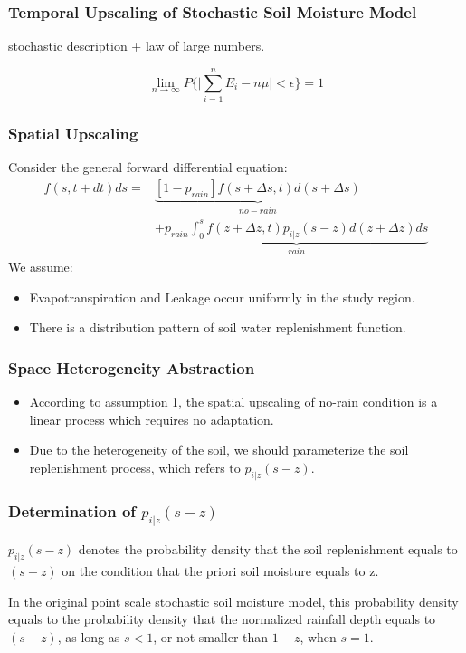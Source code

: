 \documentclass{beamer}
\begin{document}
\begin{frame}
\frametitle{Temporal Upscaling of Stochastic Soil Moisture Model}
\begin{center}
stochastic description + law of large numbers.
\end{center} 
\begin{equation}
\lim_{n\to\infty}P\lbrace\vert\sum_{i=1}^n E_i-n\mu\vert<\epsilon\rbrace=1
\end{equation}
\end{frame}
\begin{frame}
\frametitle{Spatial Upscaling}
Consider the general forward differential equation:
\begin{equation*}
\begin{split}
f(s,t+dt)ds=&\underbrace{[1-p_{rain}]f(s+\Delta s,t)d(s+\Delta s)}_{no-rain}\\&+\underbrace{p_{rain} \int_{0}^{s} f(z+\Delta z,t)p_{i|z}(s-z)d(z+\Delta z)ds}_{rain}
\end{split}
\end{equation*}
We assume:
\begin{itemize}
\item Evapotranspiration and Leakage occur uniformly in the study region.
\item There is a distribution pattern of soil water replenishment function.  
\end{itemize}
\end{frame}
\begin{frame}
\frametitle{Space Heterogeneity Abstraction}
\begin{itemize}
\item According to assumption 1, the spatial upscaling of no-rain condition is a linear process which requires no adaptation.
\item Due to the heterogeneity of the soil, we should parameterize the soil replenishment process, which refers to $p_{i|z}(s-z)$.
\end{itemize}
\end{frame}
\begin{frame}
\frametitle{Determination of $p_{i|z}(s-z)$}
$p_{i|z}(s-z)$ denotes the probability density that the soil replenishment equals to $(s-z)$ on the condition that the priori soil moisture equals to z.
 
In the original point scale stochastic soil moisture model, this probability density equals to the probability density that the normalized rainfall depth equals to $(s-z)$, as long as $s<1$, or not smaller than $1-z$, when $s=1$.  
\end{frame}
\end{document}
